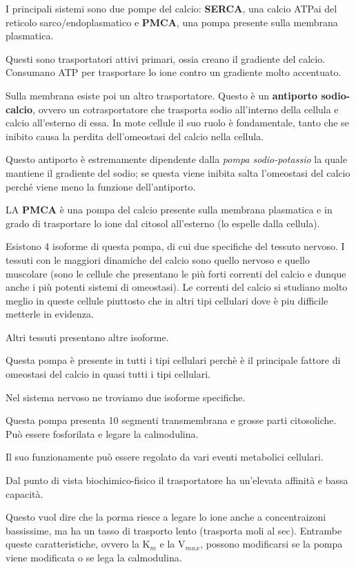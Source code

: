 \documentclass[]{article}
\begin{document}
I principali sistemi sono due pompe del calcio: \textbf{SERCA}, una
calcio ATPai del reticolo sarco/endoplasmatico e \textbf{PMCA}, una
pompa presente sulla membrana plasmatica.

Questi sono trasportatori attivi primari, ossia creano il gradiente del
calcio. Consumano ATP per trasportare lo ione contro un gradiente molto
accentuato.

Sulla membrana esiste poi un altro trasportatore. Questo è un
\textbf{antiporto sodio-calcio}, ovvero un cotrasportatore che trasporta
sodio all'interno della cellula e calcio all'esterno di essa. In mote
cellule il suo ruolo è fondamentale, tanto che se inibito causa la
perdita dell'omeostasi del calcio nella cellula.

Questo antiporto è estremamente dipendente dalla \emph{pompa
sodio-potassio} la quale mantiene il gradiente del sodio; se questa
viene inibita salta l'omeostasi del calcio perché viene meno la funzione
dell'antiporto.

LA \textbf{PMCA} è una pompa del calcio presente sulla membrana
plasmatica e in grado di trasportare lo ione dal citosol all'esterno (lo
espelle dalla cellula).

Esistono 4 isoforme di questa pompa, di cui due specifiche del tessuto
nervoso. I tessuti con le maggiori dinamiche del calcio sono quello
nervoso e quello muscolare (sono le cellule che presentano le più forti
correnti del calcio e dunque anche i più potenti sistemi di omeostasi).
Le correnti del calcio si studiano molto meglio in queste cellule
piuttosto che in altri tipi cellulari dove è piu difficile metterle in
evidenza.

Altri tessuti presentano altre isoforme.

Questa pompa è presente in tutti i tipi cellulari perchè è il principale
fattore di omeostasi del calcio in quasi tutti i tipi cellulari.

Nel sistema nervoso ne troviamo due isoforme specifiche.

Questa pompa presenta 10 segmenti transmembrana e grosse parti
citosoliche. Può essere fosforilata e legare la calmodulina.

Il suo funzionamente può essere regolato da vari eventi metabolici
cellulari.

Dal punto di vista biochimico-fisico il trasportatore ha un'elevata
affinità e bassa capacità.

Questo vuol dire che la porma riesce a legare lo ione anche a
concentraizoni bassissime, ma ha un tasso di trasporto lento (trasporta
moli al sec). Entrambe queste caratteristiche, ovvero la K\(_m\) e la
V\(_m\)\(_a\)\(_x\), possono modificarsi se la pompa viene modificata o
se lega la calmodulina.
\end{document}
